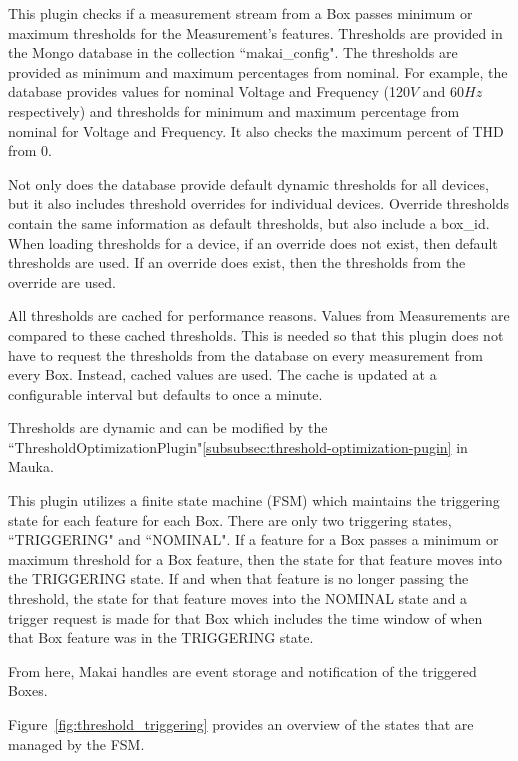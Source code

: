 This plugin checks if a measurement stream from a Box passes minimum or maximum thresholds for the Measurement's features. Thresholds are provided in the Mongo database in the collection ``makai\_config". The thresholds are provided as minimum and maximum percentages from nominal. For example, the database provides values for nominal Voltage and Frequency (120$V$ and 60$Hz$ respectively) and thresholds for minimum and maximum percentage from nominal for Voltage and Frequency. It also checks the maximum percent of THD from 0.

Not only does the database provide default dynamic thresholds for all devices, but it also includes threshold overrides for individual devices. Override thresholds contain the same information as default thresholds, but also include a box\_id. When loading thresholds for a device, if an override does not exist, then default thresholds are used. If an override does exist, then the thresholds from the override are used.

All thresholds are cached for performance reasons. Values from Measurements are compared to these cached thresholds. This is needed so that this plugin does not have to request the thresholds from the database on every measurement from every Box. Instead, cached values are used. The cache is updated at a configurable interval but defaults to once a minute.

Thresholds are dynamic and can be modified by the ``ThresholdOptimizationPlugin"\ref{subsubsec:threshold-optimization-pugin} in Mauka.

This plugin utilizes a finite state machine (FSM) which maintains the triggering state for each feature for each Box. There are only two triggering states, ``TRIGGERING" and ``NOMINAL". If a feature for a Box passes a minimum or maximum threshold for a Box feature, then the state for that feature moves into the TRIGGERING state. If and when that feature is no longer passing the threshold, the state for that feature moves into the NOMINAL state and a trigger request is made for that Box which includes the time window of when that Box feature was in the TRIGGERING state.

From here, Makai handles are event storage and notification of the triggered Boxes.

Figure~\ref{fig:threshold_triggering} provides an overview of the states that are managed by the FSM\@.

